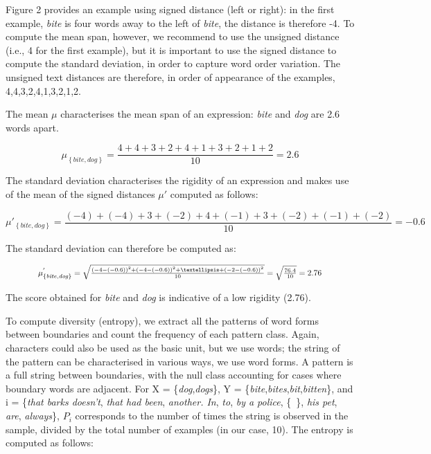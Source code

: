 \documentclass[output=paper]{langsci/langscibook}
\begin{document}
Figure 2 provides an example using signed distance (left or right): in
the first example, \textit{bite} is four words away to the left of \textit{bite}, the
distance is therefore -4. To compute the mean span, however, we
recommend to use the unsigned distance (i.e., 4 for the first example),
but it is important to use the signed distance to compute the standard
deviation, in order to capture word order variation. The unsigned text
distances are therefore, in order of appearance of the examples,
4,4,3,2,4,1,3,2,1,2.



The mean  $\mu$ characterises the mean span of an expression: \textit{bite} and
\textit{dog} are 2.6 words apart.


\begin{equation*}
\mu_{\left\{\mathit{bite},\mathit{dog}\right\}}=\frac{4+4+3+2+4+1+3+2+1+2}{10}=2.6
\end{equation*}


The standard deviation characterises the rigidity of an expression and
makes use of the mean of the signed distances  $\mu'$ computed as
follows:


\begin{equation*}
\mu'_{\left\{\mathit{bite},\mathit{dog}\right\}}=\frac{(-4)+(-4)+3+(-2)+4+(-1)+3+(-2)+(-1)+(-2)}{10}=-0.6
\end{equation*}


The standard deviation can therefore be computed as:


\begin{equation*}
\resizebox{.85\hsize}{!}{$\mu^{'}_{\left\{\mathit{bite},\mathit{dog}\right\}}=\sqrt{\frac{\left(-4-\left(-0.6\right)\right)^2+\left(-4-\left(-0.6\right)\right)^2+%
…+\left(-2-\left(-0.6\right)\right)^2}{10}}=\sqrt{\frac{76.4}{10}}=2.76$}
\end{equation*}





The score obtained for \textit{bite} and \textit{dog} is indicative of a low rigidity (2.76).



To compute diversity (entropy), we extract all the patterns of word
forms between boundaries and count the frequency of each pattern class.
Again, characters could also be used as the basic unit, but we use
words; the string of the pattern can be characterised in various ways,
we use word forms. A pattern is a full string between boundaries, with
the null class accounting for cases where boundary words are adjacent.
For X = \{\textit{dog},\textit{dogs}\}, Y = \{\textit{bite},\textit{bites},\textit{bit},\textit{bitten}\}, and i = \{\textit{that
barks doesn’t}, \textit{that had been}, \textit{another. In}, \textit{to}, \textit{by a police},
\{~\}, \textit{his pet}, \textit{are}, \textit{always}\},  $P_i$ corresponds to the number of
times the string is observed in the sample, divided by the total number
of examples (in our case, 10). The entropy is computed as follows:
\end{document}
